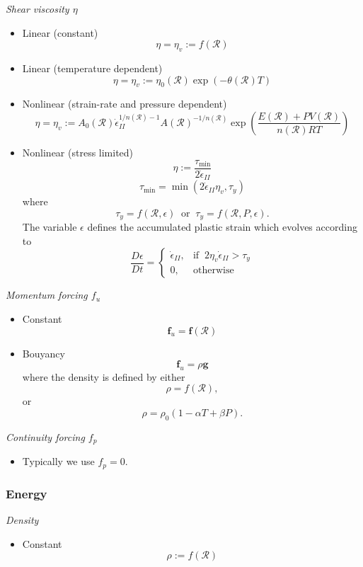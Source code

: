 \documentclass[paper=a4, fontsize=10pt,twoside]{scrartcl}
\begin{document}
\textit{Shear viscosity $\eta$}
\begin{itemize}
\item Linear (constant)
$$
	\eta = \eta_v := f(\mathcal R)
$$
\item Linear (temperature dependent)
$$
	\eta = \eta_v := \eta_0(\mathcal R) \exp( -\theta(\mathcal R) T)
$$
\item Nonlinear (strain-rate and pressure dependent)
$$
	\eta = \eta_v := A_0(\mathcal R) \dot{\epsilon}_{II}^{1/n(\mathcal R) - 1}
		 A(\mathcal R)^{-1/n(\mathcal R)} \exp\left( 
		\frac{E(\mathcal R) + P V(\mathcal R)}{n(\mathcal R) R T}
	\right)
$$

\item Nonlinear (stress limited)
$$
	\eta := \frac{\tau_\text{min}}{2 \dot{\epsilon}_{II}}
$$
$$
	\tau_\text{min} = \min( 2 \dot{\epsilon}_{II} \eta_v, \tau_y )
$$
where
$$ 
	\tau_y = f(\mathcal R,\epsilon)
	\medspace
	\text{ or }
	\medspace
	\tau_y = f(\mathcal R,P,\epsilon).
$$
The variable $\epsilon$ defines the accumulated plastic strain which evolves according to
$$
	\frac{D\epsilon}{Dt}
	=
	\begin{cases}
    \dot{\epsilon}_{II}, & \text{if } \medspace 2 \eta_v \dot{\epsilon}_{II} > \tau_y \\
    0,                    & \text{otherwise}
	\end{cases}
$$
\end{itemize}

\textit{Momentum forcing $f_u$}
\begin{itemize}
\item Constant
$$
\boldsymbol f_u = \boldsymbol f(\mathcal R)
$$
\item Bouyancy
$$
\boldsymbol f_u = \rho \boldsymbol g
$$
where the density is defined by either
$$
\rho = f(\mathcal R),
$$
or
$$
\rho = \rho_0 ( 1 - \alpha T + \beta P ).
$$
\end{itemize}

\textit{Continuity forcing $f_p$}
\begin{itemize}
\item Typically we use $f_p = 0$.
\end{itemize}


\subsubsection*{Energy}

\textit{Density}
\begin{itemize}
\item Constant
$$
	\rho := f(\mathcal R)
$$
\end{itemize}
\end{document}
